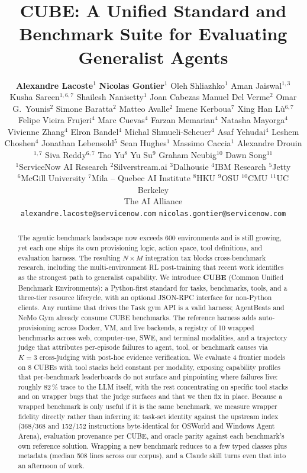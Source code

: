 \documentclass{article}
\title{CUBE: A Unified Standard and Benchmark Suite for Evaluating Generalist Agents}
\author{%
  \textbf{Alexandre Lacoste}$^{1}$ \quad
  \textbf{Nicolas Gontier}$^{1}$ \quad
  Oleh Shliazhko$^{1}$ \quad
  Aman Jaiswal$^{1,3}$ \quad
  Kusha Sareen$^{1,6,7}$ \quad
  Shailesh Nanisetty$^{1}$ \quad
  Joan Cabezas \quad
  Manuel Del Verme$^{2}$ \quad
  Omar G.\ Younis$^{2}$ \quad
  Simone Baratta$^{2}$ \quad
  Matteo Avalle$^{2}$ \quad
  Imene Kerboua$^{7}$ \quad
  Xing Han L\`{u}$^{6,7}$ \quad
  Felipe Vieira Frujeri$^{4}$ \quad
  Marc Cuevas$^{4}$ \quad
  Farzan Memarian$^{4}$ \quad
  Natasha Mayorga$^{4}$ \quad
  Vivienne Zhang$^{4}$ \quad
  Elron Bandel$^{4}$ \quad
  Michal Shmueli-Scheuer$^{4}$ \quad
  Asaf Yehudai$^{4}$ \quad
  Leshem Choshen$^{4}$ \quad
  Jonathan Lebensold$^{5}$ \quad
  Sean Hughes$^{1}$ \quad
  Massimo Caccia$^{1}$ \quad
  Alexandre Drouin$^{1,7}$ \quad
  Siva Reddy$^{6,7}$ \quad
  Tao Yu$^{8}$ \quad
  Yu Su$^{9}$ \quad
  Graham Neubig$^{10}$ \quad
  Dawn Song$^{11}$ \\[6pt]
  \small
  $^{1}$ServiceNow AI Research \quad
  $^{2}$Silverstream.ai \quad
  $^{3}$Dalhousie \quad
  $^{4}$IBM Research \quad
  $^{5}$Jetty \\
  $^{6}$McGill University \quad
  $^{7}$Mila -- Quebec AI Institute \quad
  $^{8}$HKU \quad
  $^{9}$OSU \quad
  $^{10}$CMU \quad
  $^{11}$UC Berkeley \\
  The AI Alliance \\[4pt]
  \texttt{alexandre.lacoste@servicenow.com} \quad \texttt{nicolas.gontier@servicenow.com}
}
\newcommand{\NUMCUBES}{10}            %
\newcommand{\NUMEXP}{8}               %
\newcommand{\NUMMODELS}{4}            %
\begin{document}
\maketitle
\enlargethispage{1.5cm}

\begin{abstract}
The agentic benchmark landscape now exceeds 600 environments and is
still growing, yet each one ships its own provisioning logic, action
space, tool definitions, and evaluation harness. The resulting
$N\times M$ integration tax blocks cross-benchmark research,
including the multi-environment RL post-training that recent work
identifies as the strongest path to generalist capability.
We introduce \textbf{CUBE} (Common Unified Benchmark Environments): a
Python-first standard for tasks, benchmarks, tools, and a three-tier
resource lifecycle, with an optional JSON-RPC interface for non-Python
clients. Any runtime that drives the \texttt{Task} gym API is a valid
harness; AgentBeats and NeMo Gym already consume CUBE benchmarks.
The reference harness adds auto-provisioning across Docker, VM, and
live backends, a registry of \NUMCUBES{} wrapped benchmarks across
web, computer-use, SWE, and terminal modalities, and a trajectory
judge that attributes per-episode failures to agent, tool, or
benchmark causes via $K{=}3$ cross-judging with post-hoc evidence
verification.
We evaluate \NUMMODELS{} frontier models on \NUMEXP{} CUBEs with tool
stacks held constant per modality, exposing capability profiles that
per-benchmark leaderboards do not surface and pinpointing where
failures live: roughly 82\,\% trace to the LLM itself, with the rest
concentrating on specific tool stacks and on wrapper bugs that the
judge surfaces and that we then fix in place. Because a wrapped
benchmark is only useful if it is the same benchmark, we measure
wrapper fidelity directly rather than inferring it: task-set identity
against the upstream index (368/368 and 152/152 instructions
byte-identical for OSWorld and Windows Agent Arena), evaluation
provenance per CUBE, and oracle parity against each benchmark's own
reference solution. Wrapping a new benchmark reduces to a few typed
classes plus metadata (median 508 lines across our corpus), and a
Claude skill turns even that into an afternoon of work.
\end{abstract}


\end{document}
